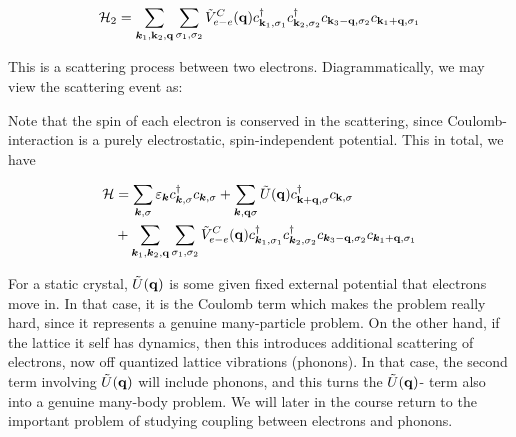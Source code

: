 \begin{align*}
\mathcal{H}_2 = \sum_{\bm{k}_1,\vb{k}_2,\vb{q} } \sum_{\sigma_1, \sigma_2} \tilde{V}_{e-e}^C (\vb{q}) c^{\dagger}_{ \vb{k}_1, \sigma_1} c^{\dagger}_{ \vb{k}_2, \sigma_2}  c_{ \vb{k}_3-\vb{q}, \sigma_2} c_{ \vb{k}_1+\vb{q}, \sigma_1}
\end{align*}

\noindent This is a scattering process between two electrons. 
\noindent Diagrammatically, we may view the scattering event as: 

 
\begin{center}
\end{center}

\noindent Note that the spin of each electron is conserved in the scattering, since Coulomb-interaction is a purely electrostatic, spin-independent potential. This in total, we have

\begin{align*}
	\mathcal{H} &= \sum_{\bm{k}, \sigma} \varepsilon_{\bm{k}} c^{\dagger}_{ \bm{k}, \sigma} c_{\bm{k}, \sigma} +  \sum_{\bm{k}, \vb{q} \sigma} \tilde{U}(\vb{q}) c^{\dagger}_{ \vb{k}+\vb{q}, \sigma}c_{\vb{k}, \sigma}\\
	& +  \sum_{\bm{k}_1,\bm{k}_2,\vb{q} } \sum_{\sigma_1, \sigma_2} \tilde{V}_{e-e}^C (\vb{q}) c^{\dagger}_{ \bm{k}_1, \sigma_1} c^{\dagger}_{ \bm{k}_2, \sigma_2}  c_{ \bm{k}_3-\vb{q}, \sigma_2} c_{ \bm{k}_1+\vb{q}, \sigma_1}
\end{align*}

\noindent For a static crystal, $\tilde{U}(\vb{q})$ is some given fixed external potential that electrons move in. In that case, it is the Coulomb term which makes the problem really hard, since it represents a genuine many-particle problem. On the other hand, if the lattice it self has dynamics, then this introduces additional scattering of electrons, now off quantized lattice vibrations (phonons). In that case, the second term involving $\tilde{U}(\vb{q})$ will include phonons, and this turns the $\tilde{U}(\vb{q})$- term also into a genuine many-body problem. We will later in the course return to the important problem of studying coupling between electrons and phonons.\newline
